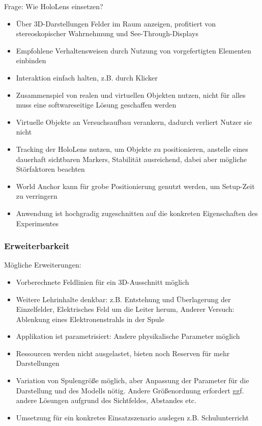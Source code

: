 Frage: Wie HoloLens einsetzen?

\begin{itemize}
	\item Über 3D-Darstellungen Felder im Raum anzeigen, profitiert von stereoskopischer Wahrnehmung und See-Through-Displays
	\item Empfohlene Verhaltensweisen durch Nutzung von vorgefertigten Elementen einbinden
	\item Interaktion einfach halten, z.B. durch Klicker
	\item Zusammenspiel von realen und virtuellen Objekten nutzen, nicht für alles muss eine softwareseitige Lösung geschaffen werden
	\item Virtuelle Objekte an Versuchsaufbau verankern, dadurch verliert Nutzer sie nicht
	\item Tracking der HoloLens nutzen, um Objekte zu positionieren, anstelle eines dauerhaft sichtbaren Markers, Stabilität ausreichend, dabei aber mögliche Störfaktoren beachten
	\item World Anchor kann für grobe Positionierung genutzt werden, um Setup-Zeit zu verringern
	\item Anwendung ist hochgradig zugeschnitten auf die konkreten Eigenschaften des Experimentes
\end{itemize}


\subsubsection{Erweiterbarkeit}
Mögliche Erweiterungen:
\begin{itemize}
	\item Vorberechnete Feldlinien für ein 3D-Ausschnitt möglich
	\item Weitere Lehrinhalte denkbar: z.B. Entstehung und Überlagerung der Einzelfelder, Elektrisches Feld um die Leiter herum, Anderer Versuch: Ablenkung eines Elektronenstrahls in der Spule
	\item Applikation ist parametrisiert: Andere physikalische Parameter möglich
	\item Ressourcen werden nicht ausgelastet, bieten noch Reserven für mehr Darstellungen	
	\item Variation von Spulengröße möglich, aber Anpassung der Parameter für die Darstellung und des Modells nötig. Andere Größenordnung erfordert ggf. andere Lösungen aufgrund des Sichtfeldes, Abstandes etc.
	\item Umsetzung für ein konkretes Einsatzszenario auslegen z.B. Schulunterricht
\end{itemize}

